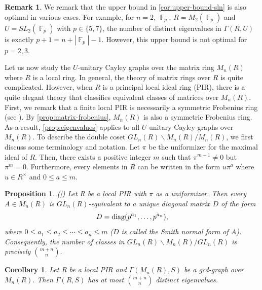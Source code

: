 \documentclass[12pt, a4paper]{amsart}
\newtheorem{prop}[thm]{Proposition}
\newtheorem{cor}[thm]{Corollary}
\theoremstyle{definition}
\newtheorem{rem}[thm]{Remark}
\DeclareMathOperator{\F}{\mathbb{F}}
\numberwithin{equation}{section}
\begin{document}
\begin{rem}
    We remark that the upper bound in \cref{cor:upper-bound-sln} is also optimal in various cases. For example, for $n=2$, $\F_p$, $R=M_2(\F_p)$ and $U=SL_2(\F_p)$ with $p \in \{5, 7\}$, the number of distinct eigenvalues in $\Gamma(R,U)$ is exactly $p+1=n+|\F_p|-1.$ However, this upper bound is not optimal for $p=2, 3.$
\end{rem}
Let us now study the $U$-unitary Cayley graphs over the matrix ring $M_n(R)$ where $R$ is a local ring. In general, the theory of matrix rings over $R$ is quite complicated. However, when $R$ is a principal local ideal ring (PIR), there is a quite elegant theory that classifies equivalent classes of matrices over $M_n(R).$ First, we remark that a finite local PIR is necessarily a symmetric Frobenius ring (see \cite{honold2001characterization}).  By \cref{prop:matrix-frobenius}, $M_n(R)$ is also a symmetric Frobenius ring.  As a result, \cref{prop:eigenvalues} applies to all $U$-unitary Cayley graphs over $M_n(R)$. To describe the double coset $GL_n(R) \backslash M_n(R) \slash M_n(R)$, we first discuss some terminology and notation. Let $\pi$ be the uniformizer for the maximal ideal of $R.$ Then, there exists a positive integer $m$ such that $\pi^{m-1} \neq 0$ but $\pi^{m}=0.$ Furthermore, every elements in $R$ can be written in the form $u\pi^a$ where $u \in R^{\times}$ and $0 \leq a \leq m.$

\begin{prop}(\cite[Theorem 15.24]{brown1993matrices}])
Let R be a local PIR with $\pi$ as a uniformizer. Then every $A \in M_n(R)$ is $GL_n(R)$-equivalent to a unique diagonal matrix $D$ of the form 
\[ D ={\rm diag}(p^{a_1}, \ldots , p^{a_n}) ,\]
where $0 \leq a_1 \leq a_2\leq  \cdots \leq a_n \leq m$ ($D$ is called \textit{the} Smith normal form of $A$). Consequently, the number of classes in $GL_n(R) \backslash M_n(R) \slash GL_n(R)$ is precisely ${m+n \choose n}.$
    
\end{prop}

\begin{cor} \label{cor:number-eigs-local-rings}
Let R be a local PIR and $\Gamma(M_n(R),S)$ be a gcd-graph over $M_n(R).$ Then $\Gamma(R,S)$ has at most ${m+n \choose n}$ distinct eigenvalues. 
\end{cor}
\end{document}
